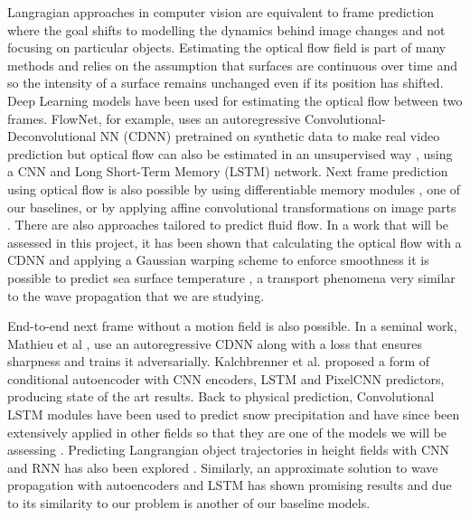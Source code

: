 \documentclass[a4paper,11pt]{article}
\begin{document}
 Langragian approaches in computer vision are equivalent to frame prediction where the goal shifts to modelling the dynamics behind image changes and not focusing on particular objects. Estimating the optical flow field is part of many methods and relies on the assumption that surfaces are continuous over time and so the intensity of a surface remains unchanged even if its position has shifted. Deep Learning models have been used for estimating the optical flow between two frames.  FlowNet, for example, uses an autoregressive Convolutional-Deconvolutional NN (CDNN) pretrained on synthetic data to make real video prediction \cite{fischer2015flownet} but optical flow can also be estimated in an unsupervised way \cite{jason2016back}, using a CNN and Long Short-Term Memory (LSTM) \cite{hochreiter1997longlstm} network. Next frame prediction using optical flow is also possible by using differentiable memory modules \cite{patraucean2015spatio}, one of our baselines, or by applying affine convolutional transformations on image parts \cite{finn2016unsupervised}. There are also approaches tailored to predict fluid flow. In a work that will be assessed in this project, it has been shown that calculating the optical flow with a CDNN and applying a Gaussian warping scheme to enforce smoothness it is possible to predict sea surface temperature \cite{bezenac2017deep}, a transport phenomena very similar to the wave propagation that we are studying.

End-to-end next frame without a motion field is also possible. In a seminal work, Mathieu et al \cite{mathieu2015deep}, use an autoregressive CDNN along with a loss that ensures sharpness and trains it adversarially. Kalchbrenner et al. proposed a form of conditional autoencoder with CNN encoders, LSTM and PixelCNN predictors, producing state of the art results. Back to physical prediction, Convolutional LSTM modules have been used to predict snow precipitation and have since been extensively applied in other fields so that they are one of the models we will be assessing \cite{xingjian2015convolutionalconvlstm}. Predicting Langrangian object trajectories in height fields with CNN and RNN has also been explored \cite{ehrhardt2017learning}. Similarly, an approximate solution to wave propagation with autoencoders and LSTM has shown promising results \cite{sorteberg2018approximating} and due to its similarity to our problem is another of our baseline models.
 
\end{document}
